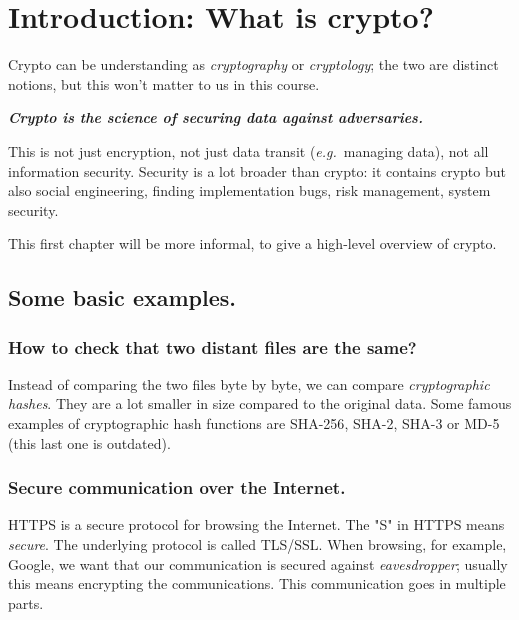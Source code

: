 \documentclass[./main]{subfiles}
\begin{document}
  \chapter{Introduction: What is crypto?}

  Crypto can be understanding as \textit{cryptography} or \textit{cryptology}; the two are distinct notions, but this won't matter to us in this course.

  \begin{center}
  \begin{minipage}{0.7\textwidth}
  \begin{center}
    \textbf{\textit{Crypto is the science of securing data against adversaries.}}
  \end{center}
  \end{minipage}
  \end{center}

  This is not just encryption, not just data transit (\textit{e.g.}\ managing data), not all information security.
  Security is a lot broader than crypto: it contains crypto but also social engineering, finding implementation bugs, risk management, system security.

  This first chapter will be more informal, to give a high-level overview of crypto.

  \section{Some basic examples.}

  \subsection{How to check that two distant files are the same?}

  Instead of comparing the two files byte by byte, we can compare \textit{cryptographic hashes}. They are a lot smaller in size compared to the original data.
  Some famous examples of cryptographic hash functions are \textsf{SHA-256}, \textsf{SHA-2}, \textsf{SHA-3} or \textsf{MD-5} (this last one is outdated).

  \subsection{Secure communication over the Internet.}

  HTTPS is a secure protocol for browsing the Internet. The "S" in HTTPS means \textit{secure}.
  The underlying protocol is called TLS/SSL.
  When browsing, for example, Google, we want that our communication is secured against \textit{eavesdropper}; usually this means encrypting the communications.
  This communication goes in multiple parts.
\end{document}
